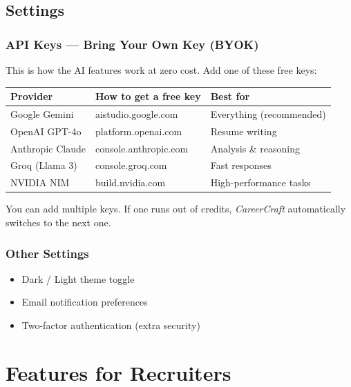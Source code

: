 \documentclass[12pt, a4paper]{report}
\newcommand{\cc}{\textit{CareerCraft}}
\begin{document}
\section{Settings}

\subsection{API Keys --- Bring Your Own Key (BYOK)}

This is how the AI features work at zero cost.  Add one of these free keys:

\begin{center}
\begin{tabular}{lll}
\toprule
\textbf{Provider} & \textbf{How to get a free key} & \textbf{Best for} \\
\midrule
Google Gemini  & aistudio.google.com     & Everything (recommended) \\
OpenAI GPT-4o  & platform.openai.com     & Resume writing \\
Anthropic Claude & console.anthropic.com & Analysis \& reasoning \\
Groq (Llama 3) & console.groq.com        & Fast responses \\
NVIDIA NIM     & build.nvidia.com        & High-performance tasks \\
\bottomrule
\end{tabular}
\end{center}

You can add multiple keys.  If one runs out of credits, \cc{} automatically
switches to the next one.

\subsection{Other Settings}

\begin{itemize}
  \item Dark / Light theme toggle
  \item Email notification preferences
  \item Two-factor authentication (extra security)
\end{itemize}

\chapter{Features for Recruiters}
\end{document}

